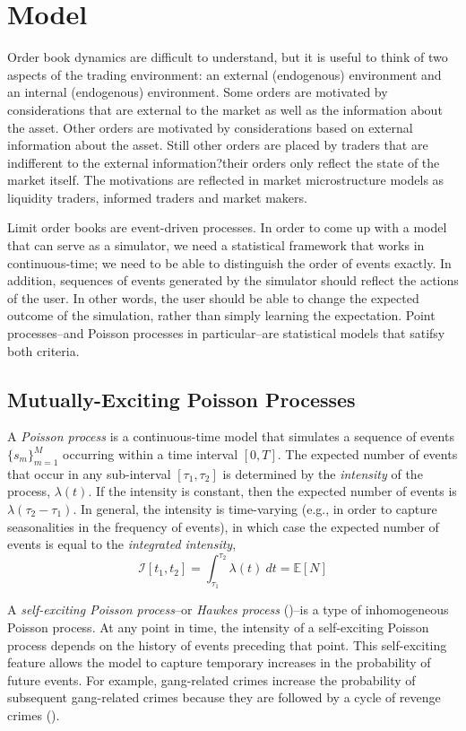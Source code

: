 \section{Model}
Order book dynamics are difficult to understand, but it is useful to think of two aspects of the trading environment: an external (endogenous) environment and an internal (endogenous) environment. Some orders are motivated by considerations that are external to the market as well as the information about the asset. Other orders are motivated by considerations based on external information about the asset. Still other orders are placed by traders that are indifferent to the external information?their orders only reflect the state of the market itself. The motivations are reflected in market microstructure models as liquidity traders, informed traders and market makers.

Limit order books are event-driven processes. In order to come up with a model that can serve as a simulator, we need a statistical framework that works in continuous-time; we need to be able to distinguish the order of events exactly. In addition, sequences of events generated by the simulator should reflect the actions of the user. In other words, the user should be able to change the expected outcome of the simulation, rather than simply learning the expectation. Point processes--and Poisson processes in particular--are statistical models that satifsy both criteria.

\subsection{Mutually-Exciting Poisson Processes}
A \textit{Poisson process} is a continuous-time model that simulates a sequence of events $\{s_m\}_{m=1}^M$ occurring within a time interval $\left[0, T\right]$. The expected number of events that occur in any sub-interval $[\tau_1, \tau_2]$ is determined by the \textit{intensity} of the process, $\lambda(t)$. If the intensity is constant, then the expected number of events is $\lambda (\tau_2 - \tau_1)$. In general, the intensity is time-varying (e.g., in order to capture seasonalities in the frequency of events), in which case the expected number of events is equal to the \textit{integrated intensity},
\begin{equation}
	\mathcal{I}\left[t_1, t_2\right] = \int_{\tau_1}^{\tau_2} \lambda(t) \ dt = \mathbb{E} \left[ N \right]
\end{equation}

A \textit{self-exciting Poisson process}--or \textit{Hawkes process} (\cite{Hawkes1971})--is a type of inhomogeneous Poisson process. At any point in time, the intensity of a self-exciting Poisson process depends on the history of events preceding that point. This self-exciting feature allows the model to capture temporary increases in the probability of future events. For example, gang-related crimes increase the probability of subsequent gang-related crimes because they are followed by a cycle of revenge crimes (\cite{Cho2013}).


